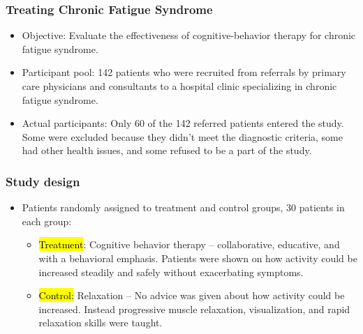 \documentclass[slidestop,compress,mathserif]{beamer}
\begin{document}
\begin{frame}
\frametitle{Treating Chronic Fatigue Syndrome}

\begin{itemize}

\item Objective: Evaluate the effectiveness of cognitive-behavior therapy for chronic fatigue syndrome.

\item Participant pool: 142 patients who were recruited from referrals by primary care physicians and consultants to a hospital clinic specializing in chronic fatigue syndrome.

\item Actual participants: Only 60 of the 142 referred patients entered the study. Some were excluded because they didn't meet the diagnostic criteria, some had other health issues, and some refused to be a part of the study.

\end{itemize}


\end{frame}


\begin{frame}
\frametitle{Study design}

\begin{itemize}

\item Patients randomly assigned to treatment and control groups, 30 patients in each group:
\begin{itemize}
\item \hl{Treatment}: Cognitive behavior therapy -- collaborative, educative, and with a behavioral emphasis. Patients were shown on how activity could be increased steadily and safely without exacerbating symptoms.
\item \hl{Control:} Relaxation -- No advice was given about how activity could be increased. Instead progressive muscle relaxation, visualization, and rapid relaxation skills were taught.
\end{itemize}

\end{itemize}

\end{frame}
\end{document}
